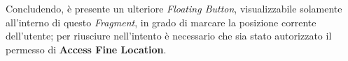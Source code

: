 \documentclass{article}
\begin{document}
    \begin{center}
        \begin{figure}[H]
            \centering
        \end{figure}
    \end{center}
    Concludendo, è presente un ulteriore \textit{Floating Button}, visualizzabile solamente all'interno di questo \textit{Fragment}, in grado di marcare la posizione corrente 
    dell'utente; per riusciure nell'intento è necessario che sia stato autorizzato il permesso di \textbf{Access Fine Location}. \vspace*{7pt}\\
\end{document}
